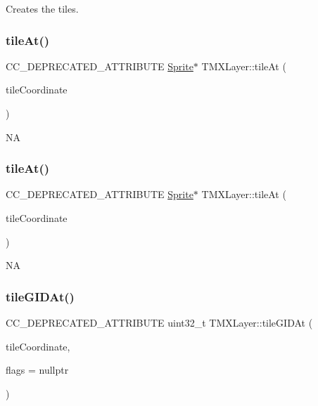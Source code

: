 Creates the tiles. \mbox{\label{classTMXLayer_a2258360648a3e91a3dccb4f52ffad8f1}} 
\subsubsection{\texorpdfstring{tile\+At()}{tileAt()}\hspace{0.1cm}{\footnotesize\ttfamily [1/2]}}
{\footnotesize\ttfamily C\+C\+\_\+\+D\+E\+P\+R\+E\+C\+A\+T\+E\+D\+\_\+\+A\+T\+T\+R\+I\+B\+U\+TE \hyperlink{classSprite}{Sprite}$\ast$ T\+M\+X\+Layer\+::tile\+At (\begin{DoxyParamCaption}\item[{const \hyperlink{classVec2}{Vec2} \&}]{tile\+Coordinate }\end{DoxyParamCaption})\hspace{0.3cm}{\ttfamily [inline]}}

NA \mbox{\label{classTMXLayer_a2258360648a3e91a3dccb4f52ffad8f1}} 
\subsubsection{\texorpdfstring{tile\+At()}{tileAt()}\hspace{0.1cm}{\footnotesize\ttfamily [2/2]}}
{\footnotesize\ttfamily C\+C\+\_\+\+D\+E\+P\+R\+E\+C\+A\+T\+E\+D\+\_\+\+A\+T\+T\+R\+I\+B\+U\+TE \hyperlink{classSprite}{Sprite}$\ast$ T\+M\+X\+Layer\+::tile\+At (\begin{DoxyParamCaption}\item[{const \hyperlink{classVec2}{Vec2} \&}]{tile\+Coordinate }\end{DoxyParamCaption})\hspace{0.3cm}{\ttfamily [inline]}}

NA \mbox{\label{classTMXLayer_a244f8bff6274b630488bf6ebebdeee5a}} 
\subsubsection{\texorpdfstring{tile\+G\+I\+D\+At()}{tileGIDAt()}\hspace{0.1cm}{\footnotesize\ttfamily [1/2]}}
{\footnotesize\ttfamily C\+C\+\_\+\+D\+E\+P\+R\+E\+C\+A\+T\+E\+D\+\_\+\+A\+T\+T\+R\+I\+B\+U\+TE uint32\+\_\+t T\+M\+X\+Layer\+::tile\+G\+I\+D\+At (\begin{DoxyParamCaption}\item[{const \hyperlink{classVec2}{Vec2} \&}]{tile\+Coordinate,  }\item[{T\+M\+X\+Tile\+Flags $\ast$}]{flags = {\ttfamily nullptr} }\end{DoxyParamCaption})\hspace{0.3cm}{\ttfamily [inline]}}

